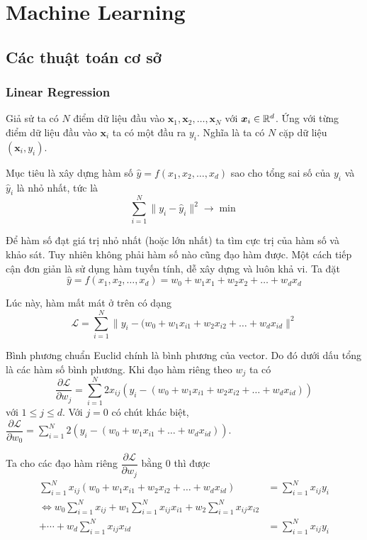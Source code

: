 \chapter{Machine Learning}

\section{Các thuật toán cơ sở}

\subsection*{Linear Regression}

Giả sử ta có $N$ điểm dữ liệu đầu vào $\bm{x}_1, \bm{x}_2, \ldots, \bm{x}_N$ với $\bm{x}_i \in \mathbb{R}^d$. Ứng với từng điểm dữ liệu đầu vào $\bm{x}_i$ ta có một đầu ra $y_i$. Nghĩa là ta có $N$ cặp dữ liệu $(\bm{x}_i, y_i)$.

Mục tiêu là xây dựng hàm số $\hat{y} = f(x_1, x_2, \ldots, x_d)$ sao cho tổng sai số của $y_i$ và $\hat{y}_i$ là nhỏ nhất, tức là \[ \sum_{i=1}^N \lVert y_i - \hat{y}_i \rVert^2 \to \min \]

Để hàm số đạt giá trị nhỏ nhất (hoặc lớn nhất) ta tìm cực trị của hàm số và khảo sát. Tuy nhiên không phải hàm số nào cũng đạo hàm được. Một cách tiếp cận đơn giản là sử dụng hàm tuyến tính, dễ xây dựng và luôn khả vi. Ta đặt \[ \hat{y} = f(x_1, x_2, \ldots, x_d) = w_0 + w_1 x_1 + w_2 x_2 + \ldots + w_d x_d \]

Lúc này, hàm mất mát ở trên có dạng \[ \mathcal{L} = \sum_{i=1}^N \lVert y_i - (w_0 + w_1 x_{i1} + w_2 x_{i2} + \ldots + w_d x_{id} \rVert^2 \]

Bình phương chuẩn Euclid chính là bình phương của vector. Do đó dưới dấu tổng là các hàm số bình phương. Khi đạo hàm riêng theo $w_j$ ta có \[ \dfrac{\partial \mathcal{L}}{\partial w_j} = \sum_{i=1}^N 2 x_{ij} (y_i - (w_0 + w_1 x_{i1} + w_2 x_{i2} + \ldots + w_d x_{id})) \] với $1 \leq j \leq d$. Với $j = 0$ có chút khác biệt, $\dfrac{\partial \mathcal{L}}{\partial w_0} = \sum_{i=1}^N 2 (y_i - (w_0 + w_1 x_{i1} + \ldots + w_d x_{id}))$.

Ta cho các đạo hàm riêng $\dfrac{\partial \mathcal{L}}{\partial w_j}$ bằng 0 thì được
\begin{align*}
    \sum_{i=1}^N x_{ij} (w_0 + w_1 x_{i1} + w_2 x_{i2} + \ldots + w_d x_{id}) & = \sum_{i=1}^N x_{ij} y_i \\ \Leftrightarrow w_0 \sum_{i=1}^N x_{ij} + w_1 \sum_{i=1}^N x_{ij} x_{i1} + w_2 \sum_{i=1}^N x_{ij} x_{i2} \\ + \cdots + w_d \sum_{i=1}^N x_{ij} x_{id} & = \sum_{i=1}^N x_{ij} y_i
\end{align*}

